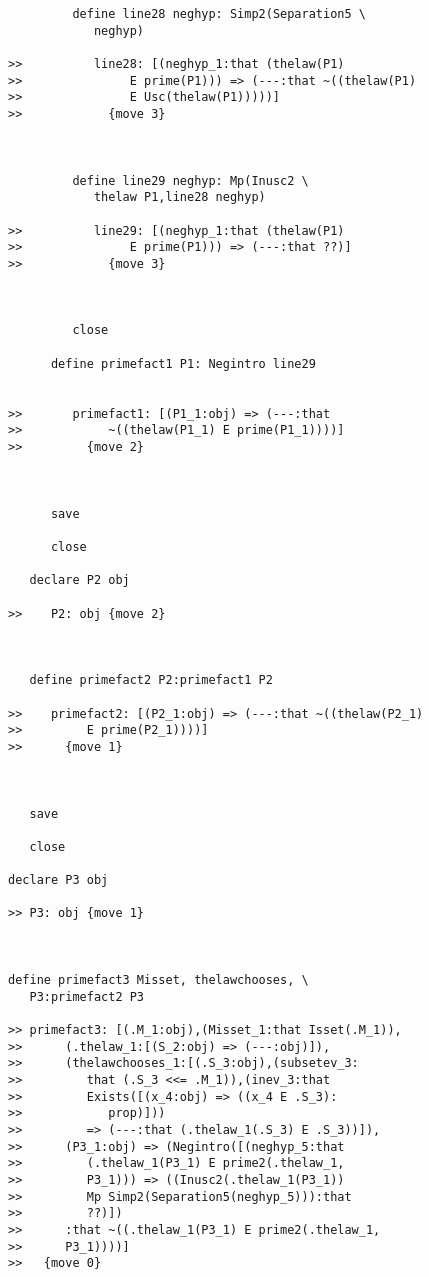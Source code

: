 \documentclass[12pt]{article}
\begin{document}
\begin{verbatim}
         define line28 neghyp: Simp2(Separation5 \
            neghyp)

>>          line28: [(neghyp_1:that (thelaw(P1)
>>               E prime(P1))) => (---:that ~((thelaw(P1)
>>               E Usc(thelaw(P1)))))]
>>            {move 3}



         define line29 neghyp: Mp(Inusc2 \
            thelaw P1,line28 neghyp)

>>          line29: [(neghyp_1:that (thelaw(P1)
>>               E prime(P1))) => (---:that ??)]
>>            {move 3}



         close

      define primefact1 P1: Negintro line29


>>       primefact1: [(P1_1:obj) => (---:that
>>            ~((thelaw(P1_1) E prime(P1_1))))]
>>         {move 2}



      save

      close

   declare P2 obj

>>    P2: obj {move 2}



   define primefact2 P2:primefact1 P2

>>    primefact2: [(P2_1:obj) => (---:that ~((thelaw(P2_1)
>>         E prime(P2_1))))]
>>      {move 1}



   save

   close

declare P3 obj

>> P3: obj {move 1}



define primefact3 Misset, thelawchooses, \
   P3:primefact2 P3

>> primefact3: [(.M_1:obj),(Misset_1:that Isset(.M_1)),
>>      (.thelaw_1:[(S_2:obj) => (---:obj)]),
>>      (thelawchooses_1:[(.S_3:obj),(subsetev_3:
>>         that (.S_3 <<= .M_1)),(inev_3:that
>>         Exists([(x_4:obj) => ((x_4 E .S_3):
>>            prop)]))
>>         => (---:that (.thelaw_1(.S_3) E .S_3))]),
>>      (P3_1:obj) => (Negintro([(neghyp_5:that
>>         (.thelaw_1(P3_1) E prime2(.thelaw_1,
>>         P3_1))) => ((Inusc2(.thelaw_1(P3_1))
>>         Mp Simp2(Separation5(neghyp_5))):that
>>         ??)])
>>      :that ~((.thelaw_1(P3_1) E prime2(.thelaw_1,
>>      P3_1))))]
>>   {move 0}




\end{verbatim}
\end{document}
